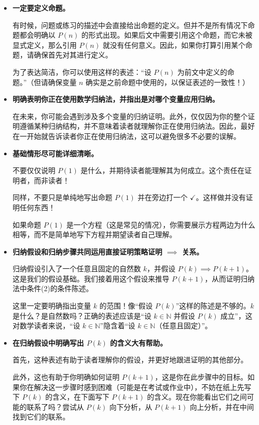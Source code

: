 \begin{itemize}
    \item \textbf{一定要定义命题。}
    
    有时候，问题或练习的描述中会直接给出命题的定义。但并不是所有情况下命题都会明确以 $P(n)$ 的形式出现。如果后文中需要引用这个命题，而它未被显式定义，那么引用 $P(n)$ 就没有任何意义。因此，如果你打算引用某个命题，请确保首先对其进行定义。

    为了表达简洁，你可以使用这样的表述：``设 $P(n)$ 为前文中定义的命题。''（但请确保变量 $n$ 确实是之前命题中使用的，以保证表述的一致性！）

    \item \textbf{明确表明你正在使用数学归纳法，并指出是对哪个变量应用归纳。}
    
    在未来，你可能会遇到涉及多个变量的归纳证明。此外，仅仅因为你的整个证明遵循某种归纳结构，并不意味着读者就理解你正在使用归纳法。因此，最好在一开始就告诉读者你正在使用归纳法，这可以避免很多不必要的误解。

    \item \textbf{基础情形尽可能详细清晰。}
    
    不要仅仅说明 $P(1)$ 是什么，并期待读者能理解其为何成立。这个责任在证明者，而非读者！

    同样，不要只是单纯地写出命题 $P(1)$ 并在旁边打一个 $\checkmark$。这样做并没有证明任何东西！

    如果命题 $P(1)$ 是一个方程（这是常见的情况），你需要展示方程两边为什么相等，而不是简单地写下方程并期望读者自己理解。

    \item \textbf{归纳假设和归纳步骤共同运用直接证明策略证明 $\implies$ 关系。}
    
    归纳假设引入了一个任意且固定的自然数 $k$，并假设 $P(k) \implies P(k+1)$。这是我们的假设基础。我们接着用这个假设来推导 $P(k+1)$，从而证明归纳法中条件(2)的条件陈述。

    这里一定要明确指出变量 $k$ 的范围！像``假设 $P(k)$''这样的陈述是不够的。$k$ 是什么？是自然数吗？正确的表述应该是``设 $k \in \mathbb{N}$ 并假设 $P(k)$ 成立''，这对数学读者来说，``设 $k \in \mathbb{N}$''隐含着``设 $k \in \mathbb{N}$（任意且固定）''。

    \item \textbf{在归纳假设中明确写出 $P(k)$ 的含义大有帮助。}
    
    首先，这种表述有助于读者理解你的假设，并更好地跟进证明的其他部分。

    此外，这也有助于你明确如何证明 $P(k+1)$，这是你在此步骤中的目标。如果你在解决这一步骤时感到困难（可能是在考试或作业中），不妨在纸上先写下 $P(k)$ 的含义，在下面写下 $P(k+1)$ 的含义。现在你能看出它们之间可能的联系了吗？尝试从 $P(k)$ 向下分析，从 $P(k+1)$ 向上分析，并在中间找到它们的联系。


\end{itemize}
